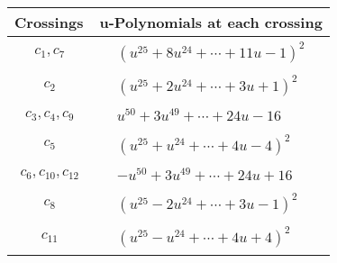 \documentclass[1p]{elsarticle_modified}
\theoremstyle{definition}
\begin{document}
\begin{tabular}{m{50pt}|m{274pt}}
Crossings & \hspace{64pt}u-Polynomials at each crossing \\
\hline $$\begin{aligned}c_{1},c_{7}\end{aligned}$$&$\begin{aligned}
&(u^{25}+8 u^{24}+\cdots+11 u-1)^{2}
\end{aligned}$\\
\hline $$\begin{aligned}c_{2}\end{aligned}$$&$\begin{aligned}
&(u^{25}+2 u^{24}+\cdots+3 u+1)^{2}
\end{aligned}$\\
\hline $$\begin{aligned}c_{3},c_{4},c_{9}\end{aligned}$$&$\begin{aligned}
&u^{50}+3 u^{49}+\cdots+24 u-16
\end{aligned}$\\
\hline $$\begin{aligned}c_{5}\end{aligned}$$&$\begin{aligned}
&(u^{25}+u^{24}+\cdots+4 u-4)^{2}
\end{aligned}$\\
\hline $$\begin{aligned}c_{6},c_{10},c_{12}\end{aligned}$$&$\begin{aligned}
&- u^{50}+3 u^{49}+\cdots+24 u+16
\end{aligned}$\\
\hline $$\begin{aligned}c_{8}\end{aligned}$$&$\begin{aligned}
&(u^{25}-2 u^{24}+\cdots+3 u-1)^{2}
\end{aligned}$\\
\hline $$\begin{aligned}c_{11}\end{aligned}$$&$\begin{aligned}
&(u^{25}- u^{24}+\cdots+4 u+4)^{2}
\end{aligned}$\\
\hline
\end{tabular}\\~\\
\newpage\renewcommand{\arraystretch}{1}
\end{document}
